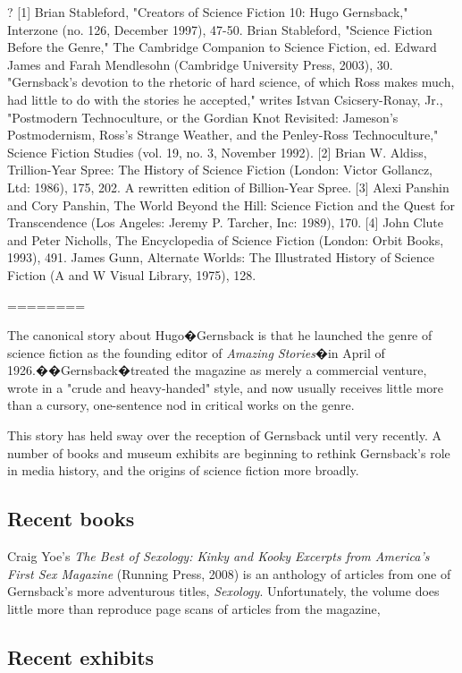 \documentclass{article}
\begin{document}
?
[1] Brian Stableford, "Creators of Science Fiction 10: Hugo Gernsback," Interzone (no. 126, December 1997), 47-50.  Brian Stableford, "Science Fiction Before the Genre," The Cambridge Companion to Science Fiction, ed. Edward James and Farah Mendlesohn (Cambridge University Press, 2003), 30.  "Gernsback's devotion to the rhetoric of hard science, of which Ross makes much, had little to do with the stories he accepted," writes Istvan Csicsery-Ronay, Jr., "Postmodern Technoculture, or the Gordian Knot Revisited: Jameson's Postmodernism, Ross's Strange Weather, and the Penley-Ross Technoculture," Science Fiction Studies (vol. 19, no. 3, November 1992).
[2] Brian W. Aldiss, Trillion-Year Spree: The History of Science Fiction (London: Victor Gollancz, Ltd: 1986), 175, 202.  A rewritten edition of Billion-Year Spree.
[3] Alexi Panshin and Cory Panshin, The World Beyond the Hill: Science Fiction and the Quest for Transcendence (Los Angeles: Jeremy P. Tarcher, Inc: 1989), 170.
[4] John Clute and Peter Nicholls, The Encyclopedia of Science Fiction (London: Orbit Books, 1993), 491. James Gunn, Alternate Worlds: The Illustrated History of Science Fiction (A and W Visual Library, 1975), 128.

========

The canonical story about Hugo�Gernsback is that he launched the genre of science fiction as the founding editor of \textit{Amazing Stories}�in April of 1926.��Gernsback�treated the magazine as merely a commercial venture, wrote in a "crude and heavy-handed" style, and now usually receives little more than a cursory, one-sentence nod in critical works on the genre.

This story has held sway over the reception of Gernsback until very recently.  A number of books and museum exhibits are beginning to rethink Gernsback's role in media history, and the origins of science fiction more broadly.

\subsection{Recent books}

Craig Yoe's \textit{The Best of Sexology: Kinky and Kooky Excerpts from America's First Sex Magazine} (Running Press, 2008) is an anthology of articles from one of Gernsback's more adventurous titles, \textit{Sexology}.  Unfortunately, the volume does little more than reproduce page scans of articles from the magazine, 

\subsection{Recent exhibits}
\end{document}
